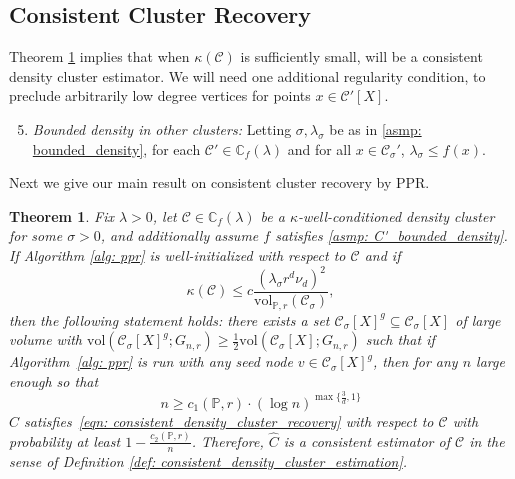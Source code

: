 \documentclass{article}
\newcommand{\vol}{\mathrm{vol}}
\newcommand{\1}{\mathbf{1}}
\newcommand{\Cset}{\mathcal{C}}
\newcommand{\Csig}{\Cset_{\sigma}}
\newcommand{\Pbb}{\mathbb{P}}
\newcommand{\Cbb}{\mathbb{C}}
\theoremstyle{alden}
\theoremstyle{aldenthm}
\newtheorem{theorem}{Theorem}
\theoremstyle{definition}
\theoremstyle{remark}
\begin{document}
\subsection{Consistent Cluster Recovery}

Theorem \ref{thm: consistent_recovery_of_density_clusters} implies that when $\kappa(\Cset)$ is sufficiently small,  will be a consistent  
density cluster estimator. We will need one additional regularity condition, to preclude arbitrarily low degree
vertices for points $x \in \Cset'[X]$. 
\begin{enumerate}[label=(A\arabic*)]
	\setcounter{enumi}{4}
	\item 
	\label{asmp: C'_bounded_density}
	\emph{Bounded density in other clusters:} Letting $\sigma,\lambda_{\sigma}$ be 
	as in \ref{asmp: bounded_density}, for each $\Cset' \in \Cbb_f(\lambda)$ and
	for all $x \in \Csig'$, $\lambda_{\sigma} \leq f(x)$. 
\end{enumerate}

Next we give our main result on consistent cluster recovery by PPR.

\begin{theorem}
	\label{thm: consistent_recovery_of_density_clusters}
	Fix $\lambda > 0$, let $\Cset \in \Cbb_f(\lambda)$ be a
	$\kappa$-well-conditioned density cluster for some $\sigma > 0$, and
	additionally assume $f$ satisfies \ref{asmp: C'_bounded_density}. If Algorithm
	\ref{alg: ppr} is well-initialized with respect to $\Cset$ and if 
	\begin{equation}
	\label{eqn: kappa_ub}
	\kappa(\Cset) \leq c \frac{(\lambda_{\sigma} r^d
		\nu_d)^2}{\vol_{\Pbb,r}(\Csig)}, 
	\end{equation}
	then the following statement holds: there exists a set $\Csig[X]^g \subseteq \Csig[X]$ of large volume 
	with $\vol(\Csig[X]^g; G_{n,r}) \geq \frac{1}{2}\vol(\Csig[X];G_{n,r})$ such that if Algorithm~\ref{alg: ppr} is run with any seed node $v \in \Csig[X]^g$,  then for any $n$ large enough so that
	\begin{equation*}
	n \geq c_1(\Pbb,r)\cdot (\log n)^{\max\{\frac{3}{d},1\}}
	\end{equation*}$\widehat{C}$ satisfies~\eqref{eqn: consistent_density_cluster_recovery} with respect to $\Cset$ with probability at least $1 - \frac{c_2(\Pbb,r)}{n}$. Therefore, $\widehat{C}$ is a consistent estimator of $\Cset$ in the sense of Definition \ref{def: consistent_density_cluster_estimation}. 
\end{theorem}
\end{document}
